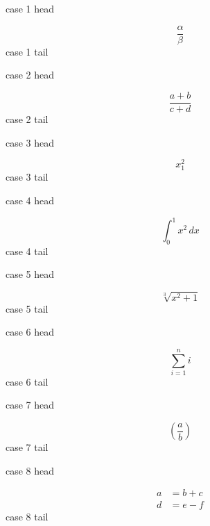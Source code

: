 \documentclass[12pt]{article}
\begin{document}
\noindent case 1 head\par
\[ \frac{\alpha}{\beta} \]
\noindent case 1 tail\par
\noindent case 2 head\par
\[ \frac{a+b}{c+d} \]
\noindent case 2 tail\par
\noindent case 3 head\par
\[ x_{1}^{2} \]
\noindent case 3 tail\par
\noindent case 4 head\par
\[ \int_{0}^{1} x^{2}\,dx \]
\noindent case 4 tail\par
\noindent case 5 head\par
\[ \sqrt[3]{x^{2}+1} \]
\noindent case 5 tail\par
\noindent case 6 head\par
\[ \sum_{i=1}^{n} i \]
\noindent case 6 tail\par
\noindent case 7 head\par
\[ \left(\frac{a}{b}\right) \]
\noindent case 7 tail\par
\noindent case 8 head\par
\[ \begin{aligned} a &= b+c \\ d &= e-f \end{aligned} \]
\noindent case 8 tail\par
\end{document}
